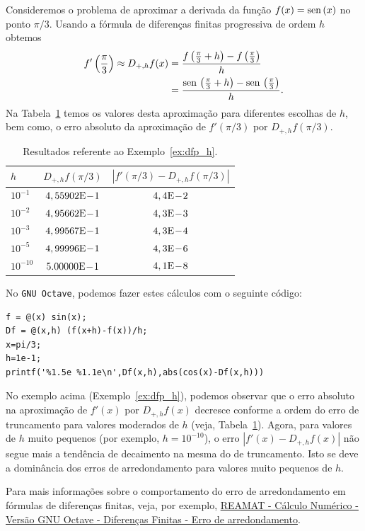\begin{ex}\label{ex:dfp_h}
  Consideremos o problema de aproximar a derivada da função $f(x) = \operatorname{sen}\,(x)$ no ponto $\pi/3$. Usando a fórmula de diferenças finitas progressiva de ordem $h$ obtemos
  \begin{align}
    f'\left(\frac{\pi}{3}\right) \approx D_{+,h}f(x) &= \frac{f\left(\frac{\pi}{3}+h\right)-f\left(\frac{\pi}{3}\right)}{h}\\
          &= \frac{\operatorname{sen}\,\left(\frac{\pi}{3}+h\right)-\operatorname{sen}\,\left(\frac{\pi}{3}\right)}{h}. 
  \end{align}
Na Tabela~\ref{tab:ex_dfp_h} temos os valores desta aproximação para diferentes escolhas de $h$, bem como, o erro absoluto da aproximação de $f'(\pi/3)$ por $D_{+,h}f(\pi/3)$.

\begin{table}[h!]
  \centering
  \caption{Resultados referente ao Exemplo~\ref{ex:dfp_h}.}
  \begin{tabular}{l|c|c}
    $h$ & $D_{+,h}f(\pi/3)$ & $|f'(\pi/3)-D_{+,h}f(\pi/3)|$\\ \hline
    $10^{-1}$ & $4,55902\mathrm{E}\!-\!1$ & $4,4\mathrm{E}\!-\!2$ \\
    $10^{-2}$ & $4,95662\mathrm{E}\!-\!1$ & $4,3\mathrm{E}\!-\!3$ \\
    $10^{-3}$ & $4,99567\mathrm{E}\!-\!1$ & $4,3\mathrm{E}\!-\!4$ \\
    $10^{-5}$ & $4,99996\mathrm{E}\!-\!1$ & $4,3\mathrm{E}\!-\!6$ \\
    $10^{-10}$ & $5.00000\mathrm{E}\!-\!1$ & $4,1\mathrm{E}\!-\!8$ \\\hline
  \end{tabular}
  \label{tab:ex_dfp_h}
\end{table}

No \verb+GNU Octave+, podemos fazer estes cálculos com o seguinte código:
\begin{verbatim}
f = @(x) sin(x);
Df = @(x,h) (f(x+h)-f(x))/h;
x=pi/3;
h=1e-1;
printf('%1.5e %1.1e\n',Df(x,h),abs(cos(x)-Df(x,h)))
\end{verbatim}
\end{ex}

\begin{obs}
  No exemplo acima (Exemplo~\ref{ex:dfp_h}), podemos observar que o erro absoluto na aproximação de $f'(x)$ por $D_{+,h}f(x)$ decresce conforme a ordem do erro de truncamento para valores moderados de $h$ (veja, Tabela~\ref{tab:ex_dfp_h}). Agora, para valores de $h$ muito pequenos (por exemplo, $h=10^{-10}$), o erro $|f'(x)-D_{+,h}f(x)|$ não segue mais a tendência de decaimento na mesma do de truncamento. Isto se deve a dominância dos erros de arredondamento para valores muito pequenos de $h$. 

  Para mais informações sobre o comportamento do erro de arredondamento em fórmulas de diferenças finitas, veja, por exemplo, \href{https://www.ufrgs.br/reamat/CalculoNumerico/livro-oct/dn-diferencas_finitas.html}{REAMAT - Cálculo Numérico - Versão GNU Octave - Diferenças Finitas - Erro de arredondamento}.
\end{obs}


